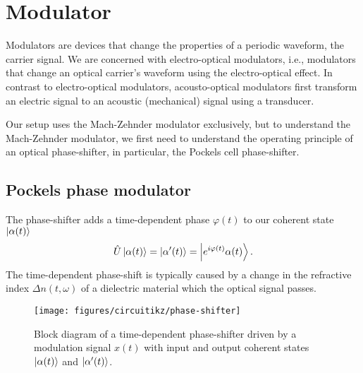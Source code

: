 \FloatBarrier
\section{Modulator}

Modulators are devices that change the properties of a periodic waveform, the carrier signal.
We are concerned with electro-optical modulators, i.e., modulators that change an optical carrier's waveform using the electro-optical effect.
In contrast to electro-optical modulators, acousto-optical modulators first transform an electric signal to an acoustic (mechanical) signal using a transducer.

Our setup uses the Mach-Zehnder modulator exclusively, but to understand the Mach-Zehnder modulator, we first need to understand the operating principle of an optical phase-shifter, in particular, the Pockels cell phase-shifter.

\FloatBarrier
\subsection{Pockels phase modulator}


The phase-shifter adds a time-dependent phase $\varphi(t)$ to our coherent state $\ket{\alpha(t)}$
\begin{equation}
	\hat{U}
	\ket{\alpha(t)}
	=
	\ket{\alpha^\prime(t)}
	=
	\ket{e^{i\varphi(t)}\alpha(t)}
	.
\end{equation}
The time-dependent phase-shift is typically caused by a change in the refractive index $\Delta n(t,\omega)$ of a dielectric material which the optical signal passes.
\begin{figure}[htb]
    \centering
    \texttt{[image: figures/circuitikz/phase-shifter]}
    \caption{Block diagram of a time-dependent phase-shifter driven by a modulation signal $x(t)$ with input and output coherent states $\ket{\alpha(t)}$ and $\ket{\alpha^\prime(t)}$.}
\end{figure}

